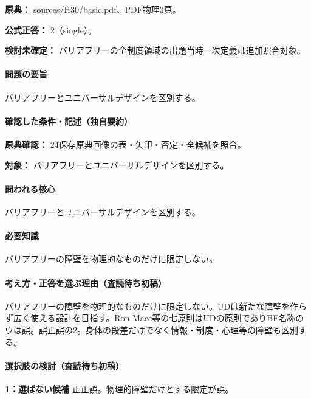 \noindent\textbf{原典：} sources/H30/basic.pdf、PDF物理3頁。

\textbf{公式正答：} 2（single）。

\par\textbf{検討未確定：} バリアフリーの全制度領域の出題当時一次定義は追加照合対象。

\paragraph{問題の要旨} バリアフリーとユニバーサルデザインを区別する。

\paragraph{確認した条件・記述（独自要約）}\mbox{}\par

\noindent\textbf{原典確認：} 24保存原典画像の表・矢印・否定・全候補を照合。\par

\noindent\textbf{対象：} バリアフリーとユニバーサルデザインを区別する。\par

\paragraph{問われる核心} バリアフリーとユニバーサルデザインを区別する。

\paragraph{必要知識} バリアフリーの障壁を物理的なものだけに限定しない。

\paragraph{考え方・正答を選ぶ理由（査読待ち初稿）} バリアフリーの障壁を物理的なものだけに限定しない。UDは新たな障壁を作らず広く使える設計を目指す。Ron Mace等の七原則はUDの原則でありBF名称のウは誤。誤正誤の2。身体の段差だけでなく情報・制度・心理等の障壁も区別する。

\paragraph{選択肢の検討（査読待ち初稿）}\mbox{}\par

\noindent\textbf{1：選ばない候補} 正正誤。物理的障壁だけとする限定が誤。\par

